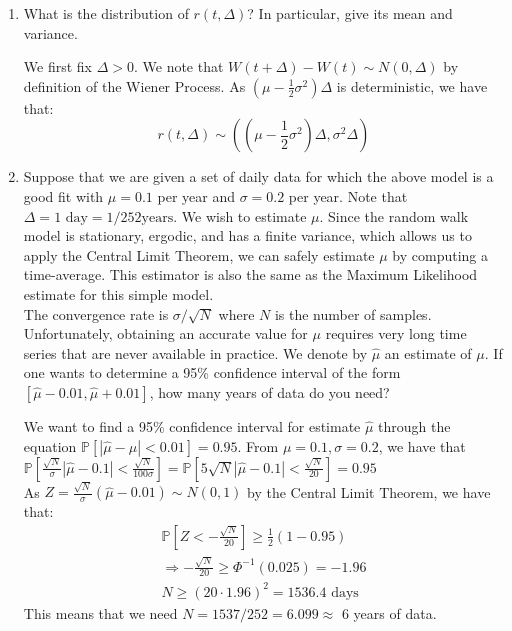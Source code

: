 \documentclass[12pt,twoside, letter]{exam}
\theoremstyle{definition}
\newcommand{\pp}{\mathbb{P}}
\begin{document}
\begin{enumerate}
  \item What is the distribution of $r(t, \Delta)$? In particular, give its mean and variance.
    \begin{solution}
      We first fix $\Delta > 0$. We note that $W(t + \Delta) - W(t) \sim N(0, \Delta)$ by definition of the Wiener Process.
      As $(\mu - \frac{1}{2}\sigma^2)\Delta$ is deterministic, we have that:
      \begin{equation*}
        r(t, \Delta) \sim ((\mu - \frac{1}{2}\sigma^2)\Delta, \sigma^2 \Delta)
      \end{equation*}
    \end{solution}
  \item Suppose that we are given a set of daily data for which the above model is a good fit with $\mu = 0.1$ per year and $\sigma = 0.2$
    per year. Note that $\Delta = \text{1 day} = 1/252 \text{years}$. We wish to estimate $\mu$. Since the random walk model is stationary, ergodic,
    and has a finite variance, which allows us to apply the Central Limit Theorem, we can safely estimate $\mu$ by computing a time-average.
    This estimator is also the same as the Maximum Likelihood estimate for this simple model. \\
    The convergence rate is $\sigma /\sqrt{N}$ where $N$ is the number of samples. Unfortunately, obtaining an accurate value for $\mu$ requires very
    long time series that are never available in practice. We denote by $\hat{\mu}$ an estimate of $\mu$. If one wants to determine a
    95\% confidence interval of the form $[\hat{\mu} - 0.01, \hat{\mu} +0.01]$, how many years of data do you need?
    \begin{solution}
      We want to find a 95\% confidence interval for estimate $\hat{\mu}$ through the equation $\pp[|\hat{\mu} - \mu|<0.01] = 0.95$.
      From $\mu = 0.1, \sigma = 0.2$, we have that $\pp[\frac{\sqrt{N}}{\sigma}|\hat{\mu} - 0.1| < \frac{\sqrt{N}}{100\sigma}]
      = \pp[5\sqrt{N}|\hat{\mu} - 0.1| < \frac{\sqrt{N}}{20}] = 0.95$ \\
      As $Z = \frac{\sqrt{N}}{\sigma}(\hat{\mu}-0.01) \sim N(0,1)$ by the Central Limit Theorem, we have that:
        \begin{align*}
          \pp[Z < -\frac{\sqrt{N}}{20}] \geq \frac{1}{2}(1 - 0.95) \\
          \Rightarrow -\frac{\sqrt{N}}{20} \geq \Phi^{-1}(0.025) = -1.96 \\
          N \geq (20 \cdot 1.96)^2 = 1536.4 \text{ days}
        \end{align*}
      This means that we need $N = 1537/252 = 6.099 \approx$ 6 years of data.
    \end{solution}
\end{enumerate}
\end{document}
